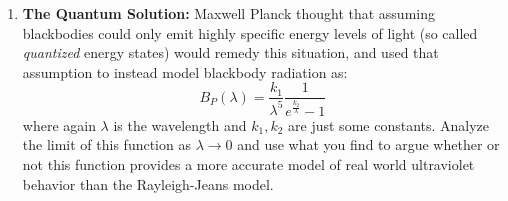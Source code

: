 \documentclass[12pt]{exam}
\begin{document}
\begin{enumerate}
\begin{enumerate}
    \item \textbf{The Quantum Solution:} Maxwell Planck thought that assuming
      blackbodies could only emit highly specific energy levels of light (so called \textit{quantized} energy states) would remedy this situation,
      and used that assumption to instead model blackbody radiation as:
      \begin{equation}
        B_P(\lambda) = \frac{k_1}{\lambda^5} \dfrac{1}{e^{\frac{k_2}{\lambda}} - 1}
      \end{equation}
      where again $\lambda$ is the wavelength and $k_1, k_2$ are just some constants. Analyze the limit of this function as $\lambda \rightarrow 0$ and use what you find to argue whether or not this function provides a more accurate model of real world ultraviolet behavior than the Rayleigh-Jeans model.
      \vfill
  \end{enumerate}

\end{enumerate}



\end{document}
